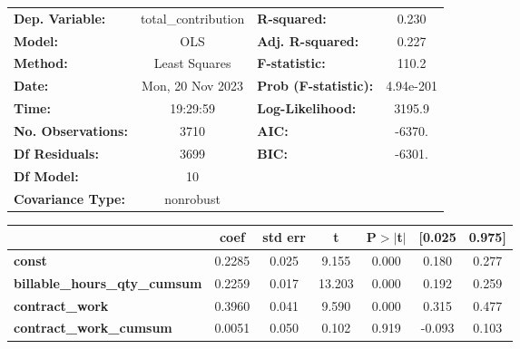 \begin{center}
\begin{tabular}{lclc}
\toprule
\textbf{Dep. Variable:}                  & total\_contribution & \textbf{  R-squared:         } &     0.230   \\
\textbf{Model:}                          &         OLS         & \textbf{  Adj. R-squared:    } &     0.227   \\
\textbf{Method:}                         &    Least Squares    & \textbf{  F-statistic:       } &     110.2   \\
\textbf{Date:}                           &   Mon, 20 Nov 2023  & \textbf{  Prob (F-statistic):} & 4.94e-201   \\
\textbf{Time:}                           &       19:29:59      & \textbf{  Log-Likelihood:    } &    3195.9   \\
\textbf{No. Observations:}               &          3710       & \textbf{  AIC:               } &    -6370.   \\
\textbf{Df Residuals:}                   &          3699       & \textbf{  BIC:               } &    -6301.   \\
\textbf{Df Model:}                       &            10       & \textbf{                     } &             \\
\textbf{Covariance Type:}                &      nonrobust      & \textbf{                     } &             \\
\bottomrule
\end{tabular}
\begin{tabular}{lcccccc}
                                         & \textbf{coef} & \textbf{std err} & \textbf{t} & \textbf{P$> |$t$|$} & \textbf{[0.025} & \textbf{0.975]}  \\
\midrule
\textbf{const}                           &       0.2285  &        0.025     &     9.155  &         0.000        &        0.180    &        0.277     \\
\textbf{billable\_hours\_qty\_cumsum}    &       0.2259  &        0.017     &    13.203  &         0.000        &        0.192    &        0.259     \\
\textbf{contract\_work}                  &       0.3960  &        0.041     &     9.590  &         0.000        &        0.315    &        0.477     \\
\textbf{contract\_work\_cumsum}          &       0.0051  &        0.050     &     0.102  &         0.919        &       -0.093    &        0.103     \\

\end{tabular}
\end{center}
